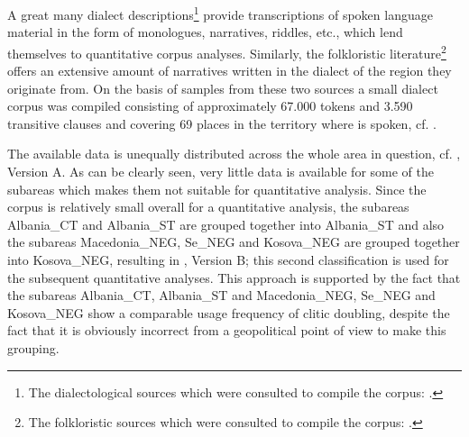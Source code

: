 \documentclass[output=paper]{langsci/langscibook}
\begin{document}
\newpage
A great many dialect descriptions\footnote{The dialectological sources which were consulted to compile the corpus: \textcites{Ahmetaj1989}{Basha1984}{Beci1974}{Beci1982}{FranoLuli1975}{Gecaj2005}{Gjinari2000}{Gosturani1975}{Gosturani1982}{Keshi2005}{Lafe1964}{Mulaku2005}{ShefqetHoxha1975}{Shkurtaj1967}{Shkurtaj1974}{Shkurtaj1975}{Shkurtaj1982}{Topalli1974}.} provide transcriptions of spoken language material in the form of monologues, narratives, riddles, etc., which lend themselves to quantitative corpus analyses. Similarly, the  folkloristic literature\footnote{The folkloristic sources which were consulted to compile the corpus: \textcites{Panajoti1988}{Cetta1982}.}  offers an extensive amount of narratives written in the dialect of the region they originate from. On the basis of samples from these two sources a small dialect corpus was compiled consisting of approximately 67.000 tokens and 3.590 transitive clauses and covering 69 places in the territory where  is spoken, cf. .

The available data is unequally distributed across the whole area in question, cf. , Version A. As can be clearly seen, very little data is available for some of the subareas which makes them not suitable for quantitative analysis. Since the corpus is relatively small overall for a quantitative analysis, the subareas Albania\_CT and Albania\_ST are grouped together into Albania\_ST and also the subareas Macedonia\_NEG, Se\_NEG and Ko\-so\-\mbox{va\_NEG} are grouped together into Ko\-so\-\mbox{va\_NEG}, resulting in , Version B; this second classification is used for the subsequent quantitative analyses. This approach is supported by the fact that the subareas Albania\_CT, Albania\_ST  and Macedonia\_NEG, Se\_NEG and Kosova\_NEG show a comparable usage frequency of clitic doubling, despite the fact that it is obviously incorrect from a geopolitical point of view to make this grouping.
\end{document}
